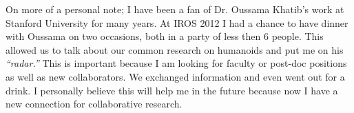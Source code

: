 \documentclass[11pt,a4paper,oneside]{report}
\begin{document}
On more of a personal note; I have been a fan of Dr. Oussama Khatib's work at Stanford University for many years.
At IROS 2012 I had a chance to have dinner with Oussama on two occasions, both in a party of less then 6 people.  
This allowed us to talk about our common research on humanoids and put me on his \textit{``radar.''}
This is important because I am looking for faculty or post-doc positions as well as new collaborators.
We exchanged information and even went out for a drink.
I personally believe this will help me in the future because now I have a new connection for collaborative research.
\end{document}
